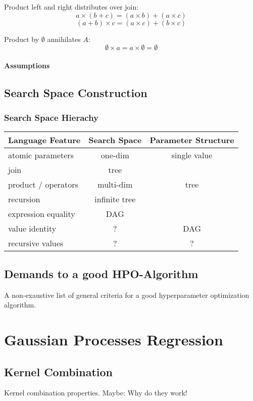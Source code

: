 \documentclass[english]{article}
\begin{document}
Product left and right distributes over join:
$$a\times(b + c) = (a\times b) + (a\times c)$$
$$(a + b)\times c = (a\times c) + (b\times c)$$

Product by $\emptyset$ annihilates $A$:
$$\emptyset \times a = a \times \emptyset = \emptyset$$

\paragraph{Assumptions}
\subsection{Search Space Construction}
\subsubsection{Search Space Hierachy}


\begin{tabular}{ l | c | c }
Language Feature & Search Space & Parameter Structure \\
\hline
atomic parameters   & one-dim          & single value \\
join                & tree             &              \\
product / operators & multi-dim        & tree         \\
recursion           & infinite tree    &              \\
expression equality & DAG              &              \\
value identity      & ?                & DAG          \\
recursive values    & ?                & ?
\end{tabular}

\subsection{Demands to a good HPO-Algorithm}
A non-exaustive list of general criteria for a good hyperparameter optimization algorithm.

\section{Gaussian Processes Regression}
\subsection{Kernel Combination}
Kernel combination properties. Maybe: Why do they work!
\end{document}
